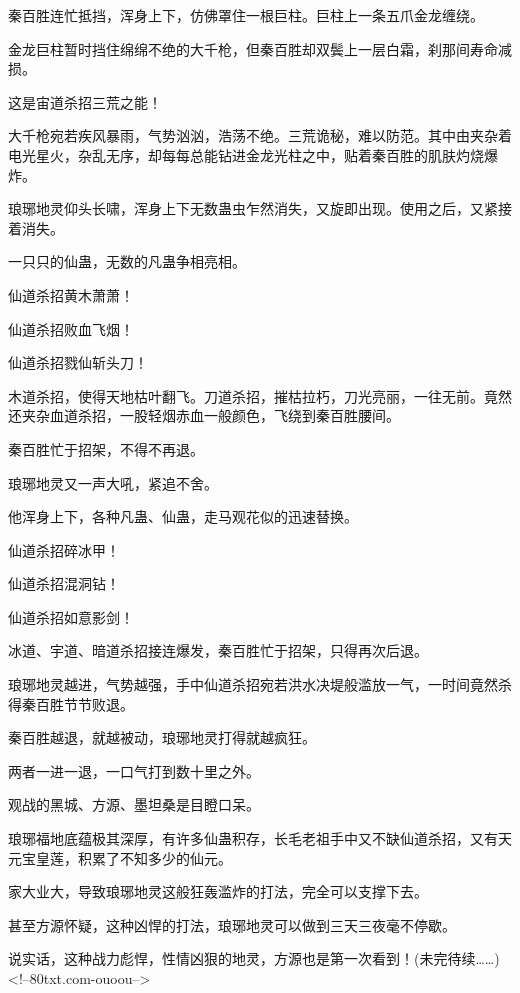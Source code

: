 \begin{this_body}
秦百胜连忙抵挡，浑身上下，仿佛罩住一根巨柱。巨柱上一条五爪金龙缠绕。

金龙巨柱暂时挡住绵绵不绝的大千枪，但秦百胜却双鬓上一层白霜，刹那间寿命减损。

这是宙道杀招三荒之能！

大千枪宛若疾风暴雨，气势汹汹，浩荡不绝。三荒诡秘，难以防范。其中由夹杂着电光星火，杂乱无序，却每每总能钻进金龙光柱之中，贴着秦百胜的肌肤灼烧爆炸。

琅琊地灵仰头长啸，浑身上下无数蛊虫乍然消失，又旋即出现。使用之后，又紧接着消失。

一只只的仙蛊，无数的凡蛊争相亮相。

仙道杀招黄木萧萧！

仙道杀招败血飞烟！

仙道杀招戮仙斩头刀！

木道杀招，使得天地枯叶翻飞。刀道杀招，摧枯拉朽，刀光亮丽，一往无前。竟然还夹杂血道杀招，一股轻烟赤血一般颜色，飞绕到秦百胜腰间。

秦百胜忙于招架，不得不再退。

琅琊地灵又一声大吼，紧追不舍。

他浑身上下，各种凡蛊、仙蛊，走马观花似的迅速替换。

仙道杀招碎冰甲！

仙道杀招混洞钻！

仙道杀招如意影剑！

冰道、宇道、暗道杀招接连爆发，秦百胜忙于招架，只得再次后退。

琅琊地灵越进，气势越强，手中仙道杀招宛若洪水决堤般滥放一气，一时间竟然杀得秦百胜节节败退。

秦百胜越退，就越被动，琅琊地灵打得就越疯狂。

两者一进一退，一口气打到数十里之外。

观战的黑城、方源、墨坦桑是目瞪口呆。

琅琊福地底蕴极其深厚，有许多仙蛊积存，长毛老祖手中又不缺仙道杀招，又有天元宝皇莲，积累了不知多少的仙元。

家大业大，导致琅琊地灵这般狂轰滥炸的打法，完全可以支撑下去。

甚至方源怀疑，这种凶悍的打法，琅琊地灵可以做到三天三夜毫不停歇。

说实话，这种战力彪悍，性情凶狠的地灵，方源也是第一次看到！(未完待续……)<!--80txt.com-ouoou-->

\end{this_body}

